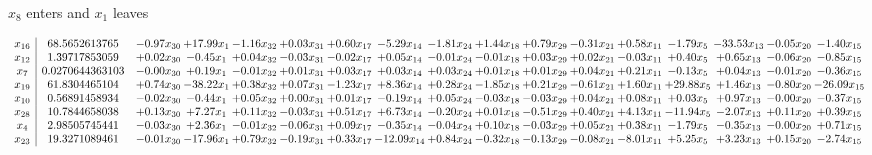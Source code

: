\documentclass[9pt]{article}
\begin{document}
 $ x_{8} $ enters and $ x_{1} $ leaves 

 \[\begin{array}{c| c c@{\hskip 2pt} c@{\hskip 2pt} c@{\hskip 2pt} c@{\hskip 2pt} c@{\hskip 2pt} c@{\hskip 2pt} c@{\hskip 2pt} c@{\hskip 2pt} c@{\hskip 2pt} c@{\hskip 2pt} c@{\hskip 2pt} c@{\hskip 2pt} c@{\hskip 2pt} c@{\hskip 2pt} c@{\hskip 2pt} }
 x_{16}   &  68.5652613765 & -0.97 x_{30} & + 17.99 x_{1} & -1.16 x_{32} & +  0.03 x_{31} & +  0.60 x_{17} & -5.29 x_{14} & -1.81 x_{24} & +  1.44 x_{18} & +  0.79 x_{29} & -0.31 x_{21} & +  0.58 x_{11} & -1.79 x_{5} & -33.53 x_{13} & -0.05 x_{20} & -1.40 x_{15}\\
 x_{12}   &  1.39717853059 & +  0.02 x_{30} & -0.45 x_{1} & +  0.04 x_{32} & -0.03 x_{31} & -0.02 x_{17} & +  0.05 x_{14} & -0.01 x_{24} & -0.01 x_{18} & +  0.03 x_{29} & +  0.02 x_{21} & -0.03 x_{11} & +  0.40 x_{5} & +  0.65 x_{13} & -0.06 x_{20} & -0.85 x_{15}\\
 x_{7}   &  0.0270644363103 & -0.00 x_{30} & +  0.19 x_{1} & -0.01 x_{32} & +  0.01 x_{31} & +  0.03 x_{17} & +  0.03 x_{14} & +  0.03 x_{24} & +  0.01 x_{18} & +  0.01 x_{29} & +  0.04 x_{21} & +  0.21 x_{11} & -0.13 x_{5} & +  0.04 x_{13} & -0.01 x_{20} & -0.36 x_{15}\\
 x_{19}   &  61.8304465104 & +  0.74 x_{30} & -38.22 x_{1} & +  0.38 x_{32} & +  0.07 x_{31} & -1.23 x_{17} & +  8.36 x_{14} & +  0.28 x_{24} & -1.85 x_{18} & +  0.21 x_{29} & -0.61 x_{21} & +  1.60 x_{11} & + 29.88 x_{5} & +  1.46 x_{13} & -0.80 x_{20} & -26.09 x_{15}\\
 x_{10}   &  0.56891458934 & -0.02 x_{30} & -0.44 x_{1} & +  0.05 x_{32} & +  0.00 x_{31} & +  0.01 x_{17} & -0.19 x_{14} & +  0.05 x_{24} & -0.03 x_{18} & -0.03 x_{29} & +  0.04 x_{21} & +  0.08 x_{11} & +  0.03 x_{5} & +  0.97 x_{13} & -0.00 x_{20} & -0.37 x_{15}\\
 x_{28}   &  10.7844658038 & +  0.13 x_{30} & +  7.27 x_{1} & +  0.11 x_{32} & -0.03 x_{31} & +  0.51 x_{17} & +  6.73 x_{14} & -0.20 x_{24} & +  0.01 x_{18} & -0.51 x_{29} & +  0.40 x_{21} & +  4.13 x_{11} & -11.94 x_{5} & -2.07 x_{13} & +  0.11 x_{20} & +  0.39 x_{15}\\
 x_{4}   &  2.98505745441 & -0.03 x_{30} & +  2.36 x_{1} & -0.01 x_{32} & -0.06 x_{31} & +  0.09 x_{17} & -0.35 x_{14} & -0.04 x_{24} & +  0.10 x_{18} & -0.03 x_{29} & +  0.05 x_{21} & +  0.38 x_{11} & -1.79 x_{5} & -0.35 x_{13} & -0.00 x_{20} & +  0.71 x_{15}\\
 x_{23}   &  19.3271089461 & -0.01 x_{30} & -17.96 x_{1} & +  0.79 x_{32} & -0.19 x_{31} & +  0.33 x_{17} & -12.09 x_{14} & +  0.84 x_{24} & -0.32 x_{18} & -0.13 x_{29} & -0.08 x_{21} & -8.01 x_{11} & +  5.25 x_{5} & +  3.23 x_{13} & +  0.15 x_{20} & -2.74 x_{15}\\

\end{array}\]
\end{document}
